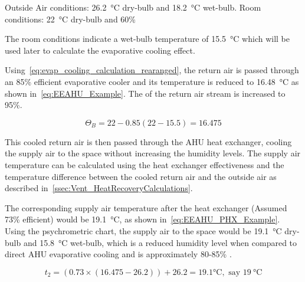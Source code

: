Outside Air conditions: \SI{26.2}{\celsius} dry-bulb and \SI{18.2}{\celsius} wet-bulb.
Room conditions: \SI{22}{\celsius} dry-bulb and 60\% 

The room conditions indicate a wet-bulb temperature of \SI{15.5}{\celsius} which will be used later to calculate the evaporative cooling effect.

Using~\autoref{eq:evap_cooling_calculation_rearanged}, the return air is passed through an 85\% efficient evaporative cooler and its temperature is reduced to \SI{16.48}{\celsius} as shown in~\autoref{eq:EEAHU_Example}. The  of the return air stream is increased to 95\%.

\begin{equation}\label{eq:EEAHU_Example}
\Theta_{B} = 22 - 0.85(22 - 15.5) = 16.475
\end{equation}

This cooled return air is then passed through the \gls{AHU} heat exchanger, cooling the supply air to the space without increasing the humidity levels. The supply air temperature can be calculated using the heat exchanger effectiveness and the temperature difference between the cooled return air and the outside air as described in~\autoref{ssec:Vent_HeatRecoveryCalculations}.

The corresponding supply air temperature after the heat exchanger (Assumed 73\% efficient) would be \SI{19.1}{\celsius}, as shown in~\autoref{eq:EEAHU_PHX_Example}. Using the psychrometric chart, the supply air to the space would be \SI{19.1}{\celsius} dry-bulb and \SI{15.8}{\celsius} wet-bulb, which is a reduced humidity level when compared to direct AHU evaporative cooling and is approximately 80-85\% .

\begin{equation}\label{eq:EEAHU_PHX_Example}
t_2 = (0.73 \times (16.475 - 26.2)) + 26.2 = 19.1\si{\celsius}, \text{ say } \SI{19}{\celsius}
\end{equation}